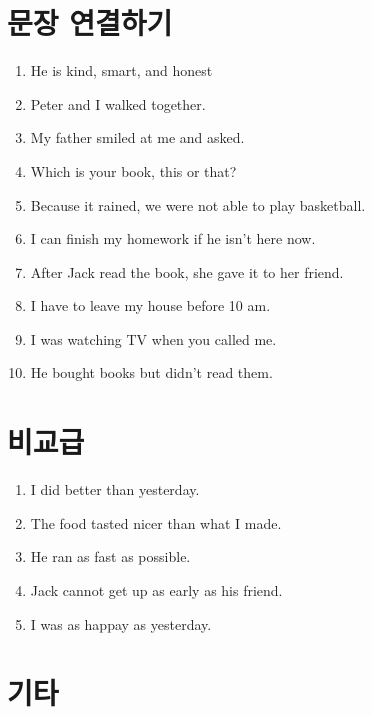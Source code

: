 \documentclass[a4paper, 12pt, twocolumn]{oblivoir}
\begin{document}
    \section{문장 연결하기} %
    \begin{enumerate}
        \item He is kind, smart, and honest
        \item Peter and I walked together. 
        \item My father smiled at me and asked.
        \item Which is your book, this or that? 
        \item Because it rained, we were not able to play basketball.
        \item I can finish my homework if he isn't here now.
        \item After Jack read the book, she gave it to her friend.
        \item I have to leave my house before 10 am. 
        \item I was watching TV when you called me. 
        \item He bought books but didn't read them. 
    \end{enumerate}
    \section{비교급}
    \begin{enumerate}
        \item I did better than yesterday.
        \item The food tasted nicer than what I made.
        \item He ran as fast as possible.
        \item Jack cannot get up as early as his friend. 
        \item I was as happay as yesterday. 
    \end{enumerate}
    \section{기타}
\end{document}
